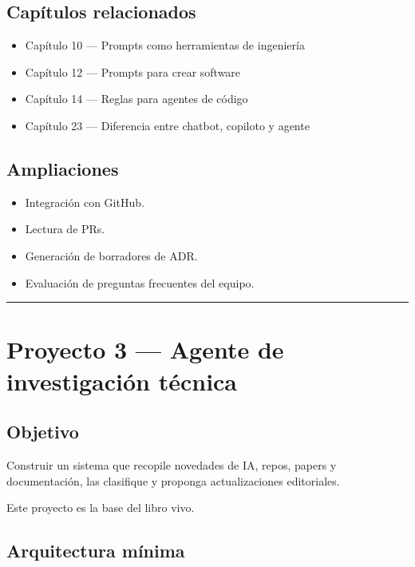 \subsection{Capítulos relacionados}\label{capuxedtulos-relacionados-1}

\begin{itemize}
\tightlist
\item
  Capítulo 10 --- Prompts como herramientas de ingeniería
\item
  Capítulo 12 --- Prompts para crear software
\item
  Capítulo 14 --- Reglas para agentes de código
\item
  Capítulo 23 --- Diferencia entre chatbot, copiloto y agente
\end{itemize}

\subsection{Ampliaciones}\label{ampliaciones-1}

\begin{itemize}
\tightlist
\item
  Integración con GitHub.
\item
  Lectura de PRs.
\item
  Generación de borradores de ADR.
\item
  Evaluación de preguntas frecuentes del equipo.
\end{itemize}

\begin{center}\rule{0.5\linewidth}{0.5pt}\end{center}

\section{Proyecto 3 --- Agente de investigación
técnica}\label{proyecto-3-agente-de-investigaciuxf3n-tuxe9cnica}

\subsection{Objetivo}\label{objetivo-5}

Construir un sistema que recopile novedades de IA, repos, papers y
documentación, las clasifique y proponga actualizaciones editoriales.

Este proyecto es la base del libro vivo.

\subsection{Arquitectura mínima}\label{arquitectura-muxednima-3}

